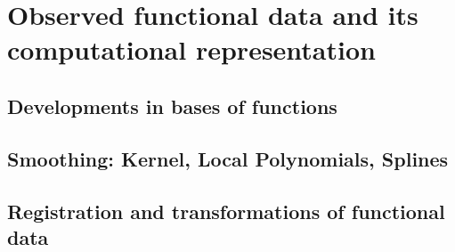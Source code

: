 \chapter{Observed functional data and its computational representation}

\section{Developments in bases of functions}
\section{Smoothing: Kernel, Local Polynomials, Splines}
\section{Registration and transformations of functional data}
